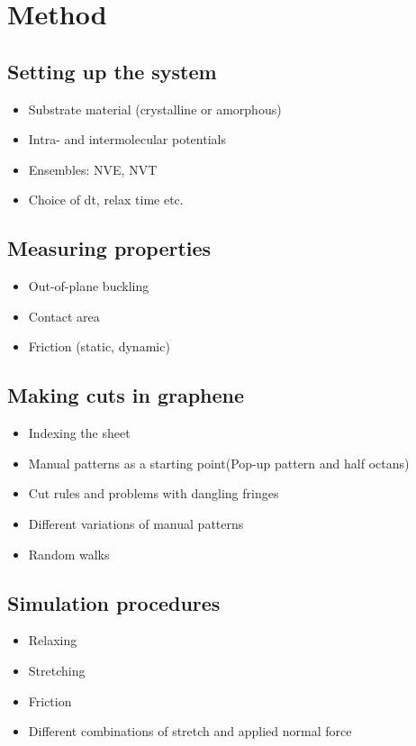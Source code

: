 \newpage
\chapter*{Method}



\section*{Setting up the system}
\begin{itemize}
  \item Substrate material (crystalline or amorphous)
  \item Intra- and intermolecular potentials
  \item Ensembles: NVE, NVT
  \item Choice of dt, relax time etc.  
\end{itemize}
\section*{Measuring properties}
\begin{itemize}
  \item Out-of-plane buckling
  \item Contact area
  \item Friction (static, dynamic)
\end{itemize}


\section*{Making cuts in graphene}
\begin{itemize}
  \item Indexing the sheet
  \item  Manual patterns as a starting point(Pop-up pattern and half octans) 
  \item Cut rules and problems with dangling fringes
  \item Different variations of manual patterns 
  \item Random walks 
\end{itemize}

\section*{Simulation procedures}
\begin{itemize}
  \item Relaxing
  \item Stretching 
  \item Friction 
  \item Different combinations of stretch and applied normal force
\end{itemize}

